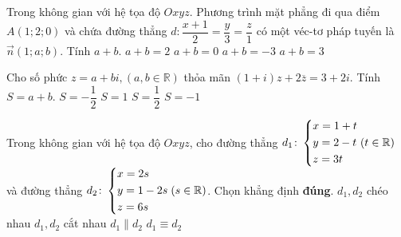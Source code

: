 \begin{ex}%
	Trong không gian với hệ tọa độ $Oxyz$. Phương trình mặt phẳng đi qua điểm $A(1;2;0)$ và chứa đường thẳng $d\colon \dfrac{x+1}{2}=\dfrac{y}{3}=\dfrac{z}{1}$ có một véc-tơ pháp tuyến là $\vec{n}(1;a;b)$. Tính $a+b$.
	\choice
	{$a+b=2$}
	{\True $a+b=0$}
	{$a+b=-3$}
	{$a+b=3$}
\end{ex}

\begin{ex}%
	Cho số phức $z=a+bi, (a,b\in \mathbb{R})$ thỏa mãn $(1+i)z+2\overline{z}=3+2i$. Tính $S=a+b$.
	\choice
	{$S=-\dfrac{1}{2}$}
	{$S=1$}
	{$S=\dfrac{1}{2}$}
	{\True $S=-1$}
\end{ex}

\begin{ex}%
	Trong không gian với hệ tọa độ $Oxyz$, cho đường thẳng $d_1\colon \left\{\begin{aligned}&x=1+t\\&y=2-t\\&z=3t\end{aligned}\right.(t\in \mathbb{R})$ và đường thẳng $d_2\colon \left\{\begin{aligned}&x=2s\\&y=1-2s\\&z=6s\end{aligned}\right.(s\in \mathbb{R})$. Chọn khẳng định \textbf{đúng}.
	\choice
	{$d_1,d_2$ chéo nhau}
	{$d_1,d_2$ cắt nhau}
	{\True $d_1\parallel d_2$}
	{$d_1\equiv d_2$}
\end{ex}

